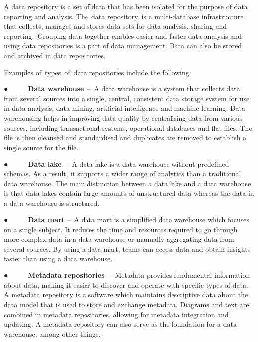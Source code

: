 \documentclass[
]{book}
\begin{document}
A data repository is a set of data that has been isolated for the purpose of data reporting and analysis. The~\href{http://digitalguardian.com/blog/what-data-repository}{}\href{http://digitalguardian.com/blog/what-data-repository}{data repository}~is a multi-database infrastructure that collects, manages and stores data sets for data analysis, sharing and reporting.~Grouping data together enables easier and faster data analysis and using data repositories is a part of data management. Data can also be stored and archived in data repositories.

Examples of~\href{https://stealthbits.com/blog/what-is-a-data-repository-and-what-is-it-used-for/}{}\href{https://stealthbits.com/blog/what-is-a-data-repository-and-what-is-it-used-for/}{types}~of~data repositories include the following:

● ~ ~ ~ \textbf{Data warehouse}~--~A data warehouse is a system that collects data from several sources into a single, central, consistent data storage system for use in data analysis, data mining, artificial intelligence and machine learning. Data warehousing helps in improving data quality by centralising data from various sources, including transactional systems, operational databases and flat files. The file is then cleansed and standardised and duplicates are removed to establish a single source for the file.

● ~ ~ ~ \textbf{Data lake}~--~A data lake is a data warehouse without predefined schemas. As a result, it supports a wider range of analytics than a traditional data warehouse. The main distinction between a data lake and a data warehouse is that data lakes contain large amounts of unstructured data whereas the data in a data warehouse is structured.

● ~ ~ ~ \textbf{Data mart} --~A data mart is a simplified data warehouse which focuses on a single subject. It reduces the time and resources required to go through more complex data in a data warehouse or manually aggregating data from several sources. By using a data mart, teams can access data and obtain insights faster than using a data warehouse.

● ~ ~ ~ \textbf{Metadata repositories}~--~Metadata provides fundamental information about data, making it easier to discover and operate with specific types of data. A metadata repository is a software which maintains descriptive data about the data model that is used to store and exchange metadata. Diagrams and text are combined in metadata repositories, allowing for metadata integration and updating. A metadata repository can also serve as the foundation for a data warehouse, among other things.
\end{document}
